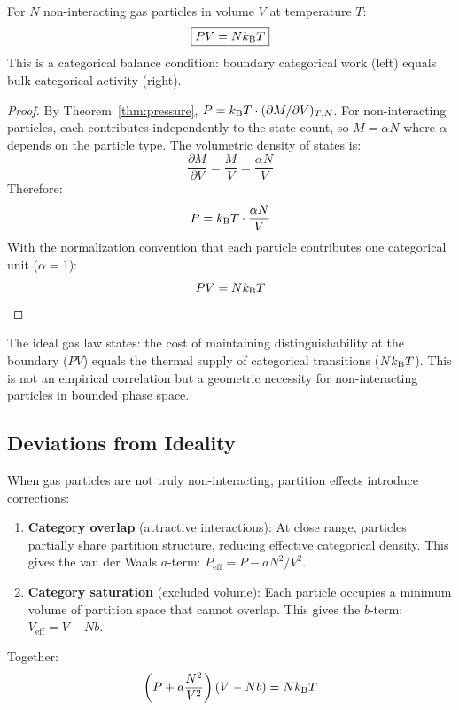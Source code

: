 \begin{theorem}
\label{thm:ideal_gas}
For $N$ non-interacting gas particles in volume $V$ at temperature $T$:
\begin{equation}
\boxed{PV = Nk_{\mathrm{B}} T}
\end{equation}
This is a categorical balance condition: boundary categorical work (left) equals bulk categorical activity (right).
\end{theorem}

\begin{proof}
By Theorem~\ref{thm:pressure}, $P = k_{\mathrm{B}} T \cdot (\partial M/\partial V)_{T,N}$. For non-interacting particles, each contributes independently to the state count, so $M = \alpha N$ where $\alpha$ depends on the particle type. The volumetric density of states is:
\begin{equation}
    \frac{\partial M}{\partial V} = \frac{M}{V} = \frac{\alpha N}{V}
\end{equation}
Therefore:
\begin{equation}
    P = k_{\mathrm{B}} T \cdot \frac{\alpha N}{V}
\end{equation}
With the normalization convention that each particle contributes one categorical unit ($\alpha = 1$):
\begin{equation}
    PV = Nk_{\mathrm{B}} T
\end{equation}
\end{proof}

\begin{remark}
The ideal gas law states: the cost of maintaining distinguishability at the boundary ($PV$) equals the thermal supply of categorical transitions ($Nk_{\mathrm{B}} T$). This is not an empirical correlation but a geometric necessity for non-interacting particles in bounded phase space.
\end{remark}

\subsection{Deviations from Ideality}

When gas particles are not truly non-interacting, partition effects introduce corrections:

\begin{proposition}
\label{prop:vdw}
\begin{enumerate}
    \item \textbf{Category overlap} (attractive interactions): At close range, particles partially share partition structure, reducing effective categorical density. This gives the van der Waals $a$-term: $P_{\mathrm{eff}} = P - a N^2/V^2$.
    \item \textbf{Category saturation} (excluded volume): Each particle occupies a minimum volume of partition space that cannot overlap. This gives the $b$-term: $V_{\mathrm{eff}} = V - Nb$.
\end{enumerate}
Together:
\begin{equation}
    \left(P + a\frac{N^2}{V^2}\right)(V - Nb) = Nk_{\mathrm{B}} T
\end{equation}
\end{proposition}

